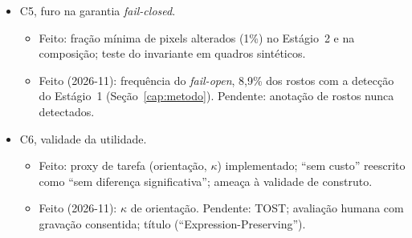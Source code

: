 \begin{itemize}
  \begin{itemize}
  \item Feito: modelo de ameaça (Seção~\ref{sec:ameaca}); alegação trocada para desidentificação facial em resumo, abstract, palavras-chave, introdução, discussão e conclusão; identificadores fora do rosto nas limitações.
  \item Pendente: \emph{parrot attack} (trabalho futuro); título (orientador).
  \end{itemize}
\item C5, furo na garantia \emph{fail-closed}.
  \begin{itemize}
  \item Feito: fração mínima de pixels alterados (1\%) no Estágio~2 e na composição; teste do invariante em quadros sintéticos.
  \item Feito (2026-11): frequência do \emph{fail-open}, 8,9\% dos rostos com a detecção do Estágio~1 (Seção~\ref{cap:metodo}). Pendente: anotação de rostos nunca detectados.
  \end{itemize}
\item C6, validade da utilidade.
  \begin{itemize}
  \item Feito: proxy de tarefa (orientação, $\kappa$) implementado; ``sem custo'' reescrito como ``sem diferença significativa''; ameaça à validade de construto.
  \item Feito (2026-11): $\kappa$ de orientação. Pendente: TOST; avaliação humana com gravação consentida; título (``Expression-Preserving'').
  \end{itemize}
\end{itemize}

